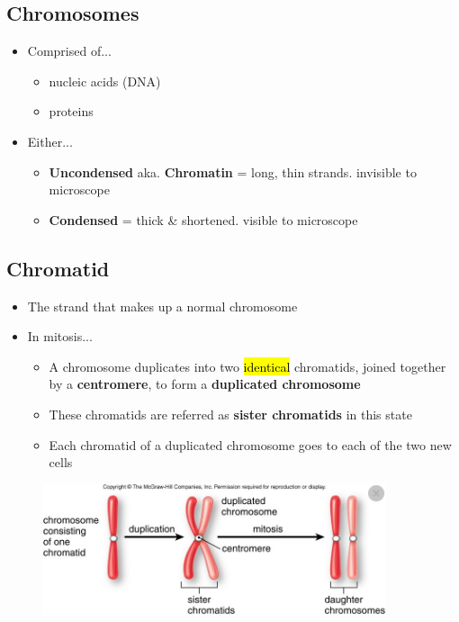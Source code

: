 \documentclass[a4paper,12pt]{article}
\begin{document}
\subsection{Chromosomes}
\begin{itemize}
    \item{
            Comprised of...
            \begin{itemize}
                \item{nucleic acids (DNA)}
                \item{proteins}
            \end{itemize}
        }
    \item{
            Either...
            \begin{itemize}
                \item{\textbf{Uncondensed} aka. \textbf{Chromatin} = long, thin strands. invisible to microscope}
                \item{\textbf{Condensed} = thick \& shortened. visible to microscope}
            \end{itemize}
        }
\end{itemize}

\subsection{Chromatid}
\begin{itemize}
    \item{The strand that makes up a normal chromosome}
    \item{
            In mitosis...
            \begin{itemize}
                \item{A chromosome duplicates into two \hl{identical} chromatids, joined together by a \textbf{centromere}, to form a \textbf{duplicated chromosome}}
                \item{These chromatids are referred as \textbf{sister chromatids} in this state}
                \item{Each chromatid of a duplicated chromosome goes to each of the two new cells}
            \end{itemize}
        }
\end{itemize}

\begin{figure}[H] \includegraphics[width=0.9\textwidth]{chromosome} \end{figure}
\end{document}
